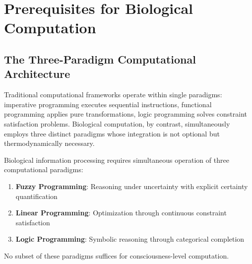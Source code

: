\section{Prerequisites for Biological Computation}

\subsection{The Three-Paradigm Computational Architecture}

Traditional computational frameworks operate within single paradigms: imperative programming executes sequential instructions, functional programming applies pure transformations, logic programming solves constraint satisfaction problems. Biological computation, by contrast, simultaneously employs three distinct paradigms whose integration is not optional but thermodynamically necessary.

\begin{theorem}
\label{thm:tri_paradigm_necessity}
Biological information processing requires simultaneous operation of three computational paradigms:
\begin{enumerate}
\item \textbf{Fuzzy Programming}: Reasoning under uncertainty with explicit certainty quantification
\item \textbf{Linear Programming}: Optimization through continuous constraint satisfaction
\item \textbf{Logic Programming}: Symbolic reasoning through categorical completion
\end{enumerate}

No subset of these paradigms suffices for consciousness-level computation.
\end{theorem}

